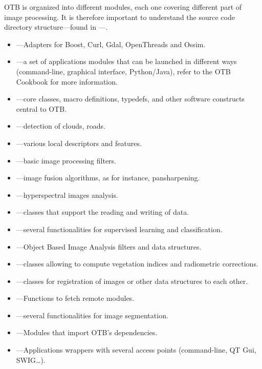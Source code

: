 OTB is organized into different modules, each one covering different part of image processing.
It is therefore important to understand the source code directory structure---found in ---.
\begin{itemize}
  \item {}---Adapters for Boost, Curl, Gdal, OpenThreads and Ossim.
  \item {}---a set of applications modules that can be launched in different ways
    (command-line, graphical interface, Python/Java), refer to the OTB Cookbook for more information.
  \item {}---core classes, macro definitions,
  typedefs, and other software constructs central to OTB.
  \item {}---detection of clouds, roads.
  \item {}---various local descriptors and features.
  \item {}---basic image processing filters.
  \item {}---image fusion algorithms, as for
  instance, pansharpening.
  \item {}---hyperspectral images analysis.
  \item {}---classes that support the reading
  and writing of data.     
  \item {}---several functionalities for
	supervised learning and classification.
  \item {}---Object Based Image Analysis filters
	and data structures.         
  \item {}---classes allowing to compute
  vegetation indices and radiometric corrections.    
  \item {}---classes for registration of images or other data structures to each other.  
  \item {}---Functions to fetch remote modules. 
  \item {}---several functionalities for image segmentation. 
  \item {}---Modules that import OTB's dependencies.
  \item {}---Applications wrappers with several access points (command-line, QT Gui, SWIG\ldots).
\end{itemize}

